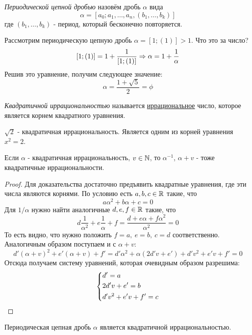 \begin{definition}
	\textit{Периодической цепной дробью} назовём дробь $\alpha$ вида
	\[
		\alpha = [a_0; a_1, \ldots, a_n, (b_1, \ldots, b_k)]
	\]
	где $(b_1, \ldots, b_k)$ - период, который бесконечно повторяется.
\end{definition}

\begin{example}
	Рассмотрим периодическую цепную дробь $\alpha = [1; (1)] > 1$. Что это за число?
	\[
		[1; (1)] = 1 + \frac{1}{[1; (1)]} \Rightarrow \alpha = 1 + \frac{1}{\alpha}
	\]
	Решив это уравнение, получим следующее значение:
	\[
		\alpha = \frac{1 + \sqrt{5}}{2} = \phi
	\]
\end{example}

\begin{definition}
	\textit{Квадратичной иррациональностью} называется \underline{иррациональное} число, которое является корнем квадратного уравнения.
\end{definition}

\begin{example}
	$\sqrt{2}$ - квадратичная иррациональность. Является одним из корней уравнения $x^2 = 2$.
\end{example}

\begin{proposition}
	Если $\alpha$ - квадратичная иррациональность, $v \in \mathbb{N}$, то $\alpha^{-1}$, $\alpha + v$ - тоже квадратичные иррациональности.
\end{proposition}

\begin{proof}
	Для доказательства достаточно предъявить квадратные уравнения, где эти числа являются корнями. По условию есть $a, b, c \in \mathbb{R}$ такие, что
	\[
		a\alpha^2 + b\alpha + c = 0
	\]
	Для $1/\alpha$ нужно найти аналогичные $d, e, f \in \mathbb{R}$ такие, что
	\[
		d\frac{1}{\alpha^2} + e\frac{1}{\alpha} + f = \frac{d + e\alpha + f\alpha^2}{\alpha^2} = 0
	\]
	То есть видно, что нужно положить $f = a,\ e = b,\ c = d$ соответственно. Аналогичным образом поступаем и с $\alpha + v$:
	\[
		d'(\alpha + v)^2 + e'(\alpha + v) + f' = d'\alpha^2 + \alpha(2d'v + e') + d'v^2 + e'v + f' = 0 
	\]
	Отсюда получаем систему уравнений, которая очевидным образом разрешима: 
	\[
		\left\{\begin{aligned}
			&{d' = a}
			\\
			&{2d'v + e' = b}
			\\
			&{d'v^2 + e'v + f' = c}
		\end{aligned}\right.
	\]
\end{proof}

\begin{proposition}
	Периодическая цепная дробь $\alpha$ является квадратичной иррациональностью.
\end{proposition}

